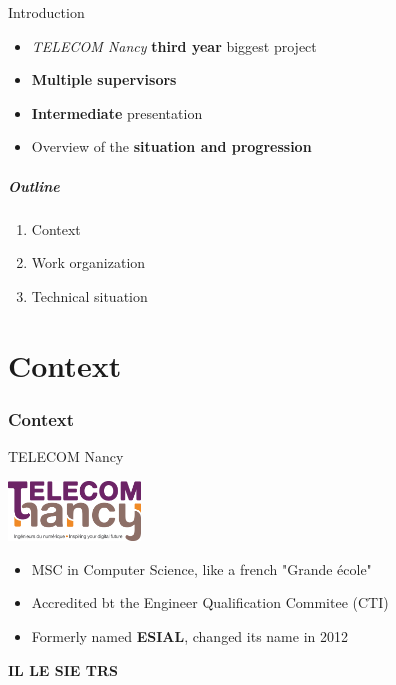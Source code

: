 \documentclass[12pt]{beamer}
\title{\titreA}
\subtitle{\titreB}
\author{Nicolas BOUGET, Julien GUÉPIN, Marc~PINHÈDE,~Julien~VAUBOURG}
\institute{TELECOM Nancy}
\date{December 20, 2012}
\begin{document}
\begin{frame}
\titlepage
\end{frame}

\begin{frame}{Introduction}
    \begin{itemize}[<+->]
	\item \emph{TELECOM Nancy} \textbf{third year} biggest project
	\vfill
	\item \textbf{Multiple supervisors}
	\vfill
	\item \textbf{Intermediate} presentation
	\vfill
	\item Overview of the \textbf{situation and progression}
    \end{itemize}
\end{frame}

\begin{frame}
    \frametitle{Outline}
    \begin{enumerate}
	\item \large{Context}
	\vfill
	\item \large{Work organization}
	\vfill
	\item \large{Technical situation}
    \end{enumerate}
\end{frame}

\part{Context}
\frame{\partpage}
\section{Context}

\begin{frame}{TELECOM Nancy}
    \begin{center}
    \includegraphics[width=100pt]{img/telecom-nancy.jpg}
    \end{center}
    \begin{itemize}[<+->]
	\item MSC in Computer Science, like a french "Grande école"
	\vfill
	\item Accredited bt the Engineer Qualification Commitee (CTI)
	\vfill
	\item Formerly named \textbf{ESIAL}, changed its name in 2012\\
    \end{itemize}
\pause
\vfill
\begin{center}
\textbf{IL \hfill\pause LE \hfill\pause SIE \hfill\pause TRS}
\end{center}
\end{frame}
\end{document}
